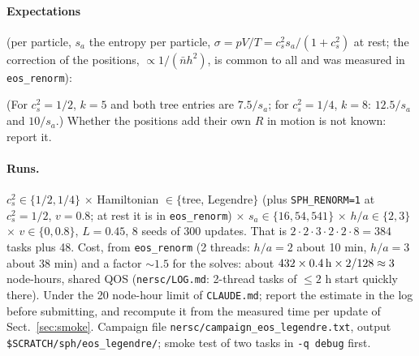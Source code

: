 \documentclass[11pt,aps,preprint,nofootinbib,superscriptaddress,tightenlines]{revtex4-2}
\def\Sect#1{Sect.~\ref{#1}}
\let\oldparagraph\paragraph
\renewcommand{\paragraph}{\par\bigskip\oldparagraph}
\begin{document}
\paragraph{Expectations} (per particle, $s_a$ the entropy per particle, $\sigma=pV/T=c_s^2s_a/(1+c_s^2)$ at rest; the correction of the positions,
$\propto1/(\bar nh^2)$, is common to all and was measured in \texttt{eos\_renorm}):
\begin{center}
\small
{}
\end{center}
(For $c_s^2=1/2$, $k=5$ and both tree entries are $7.5/s_a$; for $c_s^2=1/4$, $k=8$: $12.5/s_a$ and $10/s_a$.)  Whether the positions add their own $R$ in
motion is not known: report it.

\paragraph{Runs.}  $c_s^2\in\{1/2,1/4\}$ $\times$ Hamiltonian $\in\{$tree, Legendre$\}$ (plus \texttt{SPH\_RENORM=1} at $c_s^2=1/2$, $v=0.8$; at rest it is in
\texttt{eos\_renorm}) $\times$ $s_a\in\{16,54,541\}$ $\times$ $h/a\in\{2,3\}$ $\times$ $v\in\{0,0.8\}$, $L=0.45$, 8 seeds of 300 updates.  That is
$2\cdot2\cdot3\cdot2\cdot2\cdot8=384$ tasks plus 48.  Cost, from \texttt{eos\_renorm} (2 threads: $h/a=2$ about 10 min, $h/a=3$ about 38 min) and a factor
$\sim1.5$ for the solves: about $432\times0.4\,{\rm h}\times2/128\approx3$ node-hours, shared QOS (\nolinkurl{nersc/LOG.md}: 2-thread tasks of $\le2$ h start
quickly there).  Under the 20 node-hour limit of \nolinkurl{CLAUDE.md}; report the estimate in the log before submitting, and recompute it from the
measured time per update of \Sect{sec:smoke}.  Campaign file \nolinkurl{nersc/campaign_eos_legendre.txt}, output \texttt{\$SCRATCH/sph/eos\_legendre/};
smoke test of two tasks in \texttt{-q debug} first.
\end{document}
